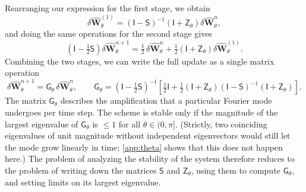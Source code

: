 \documentclass[preprint,12pt,authoryear]{elsarticle}
\newcommand{\tenS}{\mathsf{S}}
\newcommand{\tenI}{\mathsf{I}}
\newcommand{\tenG}{\mathsf{G}}
\newcommand{\tenZ}{\mathsf{Z}}
\newcommand{\hvecW}{{\hat{\mathbf{W}}}}
\begin{document}
Rearranging our expression for the first stage, we obtain
\begin{equation}
    \delta\hvecW_\theta^{(1)} = \left(\tenI - \tenS\right)^{-1}\left(\tenI + \tenZ_\theta\right)\delta\hvecW_\theta^n,
    \label{eq:stage1}
\end{equation}
and doing the same operations for the second stage gives
\begin{equation}
    \left(\tenI - \tfrac{1}{2}\tenS\right)\delta\hvecW_\theta^{n+1} = \tfrac{1}{2}\,\delta\hvecW_\theta^n + \tfrac{1}{2}\left(\tenI + \tenZ_\theta\right)\delta\hvecW_\theta^{(1)} .
    \label{eq:stage2}
\end{equation}
Combining the two stages, we can write the full update as a single matrix operation
\begin{equation}
    \delta\hvecW_\theta^{n+1} = \mathsf{G}_\theta \,\delta\hvecW_\theta^n, \qquad
    \tenG_\theta = \left(\tenI - \tfrac{1}{2}\tenS\right)^{-1}\left[\tfrac{1}{2}\tenI + \tfrac{1}{2}\left(\tenI + \tenZ_\theta\right)\left(\tenI - \tenS\right)^{-1}\left(\tenI + \tenZ_\theta\right)\right].
    \label{eq:ampl}
\end{equation}
The matrix $\tenG_\theta$ describes the amplification that a particular Fourier mode undergoes per time step. The scheme is stable only if the magnitude of the largest eigenvalue of $\tenG_\theta$ is $\leq 1$ for all $\theta \in (0,\pi]$. (Strictly, two coinciding eigenvalues of unit magnitude without independent eigenvectors would still let the mode grow linearly in time; \ref{app:theta} shows that this does not happen here.) The problem of analyzing the stability of the system therefore reduces to the problem of writing down the matrices $\tenS$ and $\tenZ_\theta$, using them to compute $\tenG_\theta$, and setting limits on its largest eigenvalue.
\end{document}

